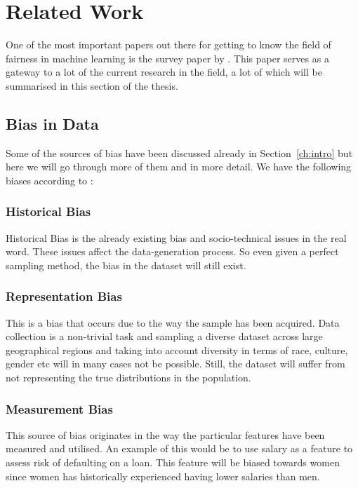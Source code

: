 \chapter{Related Work}
\label{ch:related}

One of the most important papers out there for getting to know the field of fairness in machine learning is the survey paper by \citet{Mehrabi:2021:CSUR}. This paper serves as a gateway to a lot of the current research in the field, a lot of which will be summarised in this section of the thesis.

\section{Bias in Data}

Some of the sources of bias have been discussed already in Section~\ref{ch:intro} but here we will go through more of them and in more detail. We have the following biases according to \citet{Mehrabi:2021:CSUR}:

\subsection{Historical Bias}

Historical Bias is the already existing bias and socio-technical issues in the real word. These issues affect the data-generation process. So even given a perfect sampling method, the bias in the dataset will still exist. \cite{Suresh:2019:arXiv}

\subsection{Representation Bias}

This is a bias that occurs due to the way the sample has been acquired. \cite{Suresh:2019:arXiv} Data collection is a non-trivial task and sampling a diverse dataset across large geographical regions and taking into account diversity in terms of race, culture, gender etc will in many cases not be possible. Still, the dataset will suffer from not representing the true distributions in the population.

\subsection{Measurement Bias}

This source of bias originates in the way the particular features have been measured and utilised. \cite{Suresh:2019:arXiv} An example of this would be to use salary as a feature to assess risk of defaulting on a loan. This feature will be biased towards women since women has historically experienced having lower salaries than men.

